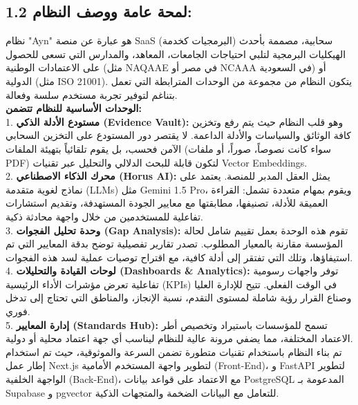 \documentclass[12pt, a4paper]{report}
\begin{document}
\begin{english}
\section*{1.2 لمحة عامة ووصف النظام:}

نظام "Ayn" هو عبارة عن منصة SaaS (البرمجيات كخدمة) سحابية، مصممة بأحدث الهيكليات البرمجية لتلبي احتياجات الجامعات، المعاهد، والمدارس التي تسعى للحصول على الاعتمادات الوطنية (مثل NAQAAE في مصر أو NCAAA في السعودية) أو الدولية (مثل ISO 21001). يتكون النظام من مجموعة من الوحدات المترابطة التي تعمل بتناغم لتوفير تجربة مستخدم سلسة وفعالة. \\

\textbf{الوحدات الأساسية للنظام تتضمن:} \\
1. \textbf{مستودع الأدلة الذكي (Evidence Vault):} وهو قلب النظام حيث يتم رفع وتخزين كافة الوثائق والسياسات والأدلة الداعمة. لا يقتصر دور المستودع على التخزين السحابي الآمن فحسب، بل يقوم تلقائياً بتهيئة الملفات (سواء كانت نصوصاً، صوراً، أو ملفات PDF) لتكون قابلة للبحث الدلالي والتحليل عبر تقنيات Vector Embeddings. \\
2. \textbf{محرك الذكاء الاصطناعي (Horus AI):} يمثل العقل المدبر للمنصة. يعتمد على نماذج لغوية متقدمة (LLMs) مثل Gemini 1.5 Pro، ويقوم بمهام متعددة تشمل: القراءة العميقة للأدلة، تصنيفها، مطابقتها مع معايير الجودة المستهدفة، وتقديم استشارات تفاعلية للمستخدمين من خلال واجهة محادثة ذكية. \\
3. \textbf{وحدة تحليل الفجوات (Gap Analysis):} تقوم هذه الوحدة بعمل تقييم شامل لحالة المؤسسة مقارنة بالمعيار المطلوب. تصدر تقارير تفصيلية توضح بدقة المعايير التي تم استيفاؤها، وتلك التي تفتقر إلى أدلة كافية، مع اقتراح توصيات عملية لسد هذه الفجوات. \\
4. \textbf{لوحات القيادة والتحليلات (Dashboards & Analytics):} توفر واجهات رسومية تفاعلية تعرض مؤشرات الأداء الرئيسية (KPIs) في الوقت الفعلي. تتيح للإدارة العليا وصناع القرار رؤية شاملة لمستوى التقدم، نسبة الإنجاز، والمناطق التي تحتاج إلى تدخل فوري. \\
5. \textbf{إدارة المعايير (Standards Hub):} تسمح للمؤسسات باستيراد وتخصيص أطر الاعتماد المختلفة، مما يضفي مرونة عالية للنظام ليناسب أي جهة اعتماد محلية أو دولية. \\

تم بناء النظام باستخدام تقنيات متطورة تضمن السرعة والموثوقية، حيث تم استخدام إطار عمل Next.js لتطوير واجهة المستخدم الأمامية (Front-End)، و FastAPI لتطوير الواجهة الخلفية (Back-End)، مع الاعتماد على قواعد بيانات PostgreSQL المدعومة بـ Supabase و pgvector للتعامل مع البيانات الضخمة والمتجهات الذكية. \\


\end{english}
\end{document}
